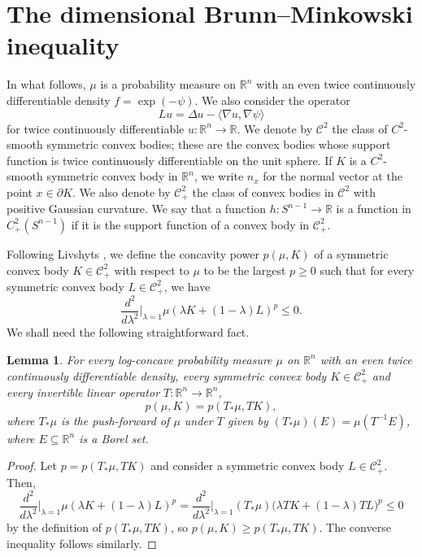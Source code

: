 \documentclass[11pt,leqno]{article}
\newtheorem{lemma}[theorem]{Lemma}
\theoremstyle{definition}
\theoremstyle{remark}
\numberwithin{equation}{section}
\newcommand{\ls}{\leqslant}
\newcommand{\gr}{\geqslant}
\newcommand{\1}{\textbf{1}}
\newcommand{\R}{\mathbb{R}}
\begin{document}
\section{The dimensional Brunn--Minkowski inequality}\label{section:3}

In what follows, $\mu$ is a probability measure on $\mathbb{R}^n$ with an even twice continuously differentiable density $f=\exp(-\psi)$.
We also consider the operator
$$Lu=\Delta u-\langle \nabla u,\nabla\psi\rangle $$
for twice continuously differentiable $u:\mathbb{R}^n\to \mathbb{R}$.
We denote by $\mathcal{C}^2$ the class of $C^2$-smooth symmetric convex bodies; these are the convex bodies whose support function is 
twice continuously differentiable on the unit sphere. If $K$ is a $C^2$-smooth symmetric convex body 
in $\mathbb{R}^n$, we write $n_x$ for the normal vector at the point $x\in\partial K$.
We also denote by $\mathcal{C}^2_+$ the class of convex bodies in $\mathcal{C}^2$ with positive Gaussian curvature. We say that a function 
$h:S^{n-1}\rightarrow \mathbb{R}$ is a function in $C^2_+(S^{n-1})$ if it is the support function of a convex body in $\mathcal{C}^2_+$. 

Following Livshyts \cite{Liv24}, we define the concavity power $p(\mu,K)$ of a symmetric convex body $K \in \mathcal{C}_+^2$ with respect to $\mu$ to be the largest $p\gr 0$ such that for every symmetric convex body $L\in\mathcal{C}_+^2$, we have
\begin{equation} \label{eq:conc-power}
\frac{d^2}{d \lambda^2} \Bigg|_{\lambda=1} \mu(\lambda K +(1-\lambda)L)^{p} \ls  0.
\end{equation}
We shall need the following straightforward fact.

\begin{lemma} \label{lem:posi}
For every log-concave probability measure $\mu$ on $\R^n$ with an even twice continuously differentiable density, every symmetric convex body $K\in\mathcal{C}_+^2$ and every invertible linear operator $T:\R^n\to\R^n$,
$$p(\mu,K) = p(T_\ast\mu, TK),$$
where $T_\ast\mu$ is the push-forward of $\mu$ under $T$ given by $(T_\ast\mu)(E)=\mu(T^{-1}E)$, where $E\subseteq\R^n$ is a Borel set.
\end{lemma}

\begin{proof}
Let $p=p(T_\ast\mu, TK)$ and consider a symmetric convex body $L\in\mathcal{C}_+^2$. Then,
$$\frac{d^2}{d\lambda^2}\Bigg|_{\lambda=1} \mu(\lambda K+(1-\lambda)L)^p = \frac{d^2}{d\lambda^2}\Bigg|_{\lambda=1} (T_\ast\mu)\big(\lambda TK + (1-\lambda)TL\big)^p \ls  0$$
by the definition of $p(T_\ast\mu, TK)$, so $p(\mu,K) \gr  p(T_\ast\mu,TK)$. The converse inequality follows similarly.
\end{proof}
\end{document}
